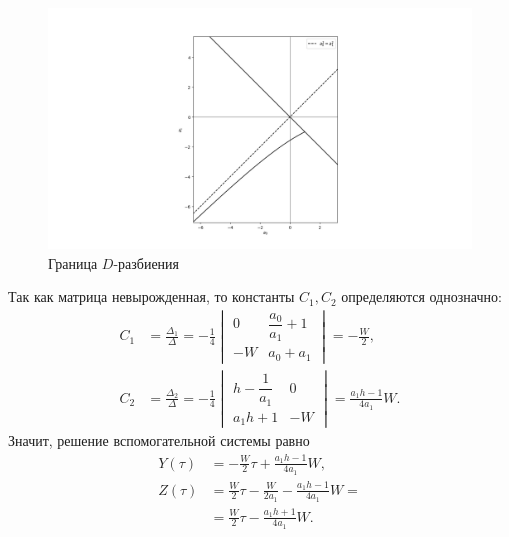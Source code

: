 \documentclass[a4paper,14pt]{article}
\begin{document}
\begin{figure}
  \centering
  \includegraphics[width=\textwidth]{first-case}
  \caption{Граница $D$-разбиения}\label{fig:first-case}
\end{figure}

Так как матрица невырожденная, то константы $C_1, C_2$
определяются однозначно:
\begin{equation*}
  \begin{aligned}
    C_1
    &=
      \frac{\Delta_1}{\Delta}
      =
      -\frac{1}{4}
      \begin{vmatrix}
        0 & \dfrac{a_0}{a_1} + 1 \\
        -W & a_0 + a_1
      \end{vmatrix}
      =
      - \frac{W}{2}, \\
    C_2
    &=
      \frac{\Delta_2}{\Delta}
      =
      - \frac{1}{4}
      \begin{vmatrix}
        h - \dfrac{1}{a_1} & 0 \\
        a_1 h + 1 & -W
      \end{vmatrix}
      =
      \frac{a_1 h - 1}{4 a_1} W.
  \end{aligned}
\end{equation*}
Значит, решение вспомогательной системы равно
\begin{equation*}
  \begin{aligned}
    Y(\tau)
    &=
      -\frac{W}{2} \tau + \frac{a_1 h - 1}{4 a_1} W, \\
    Z(\tau)
    &=
      \frac{W}{2} \tau
      - \frac{W}{2 a_1}
      - \frac{a_1 h - 1}{4 a_1} W = \\
    &=
      \frac{W}{2} \tau
      - \frac{a_1 h + 1}{4 a_1} W.
  \end{aligned}
\end{equation*}
\end{document}
